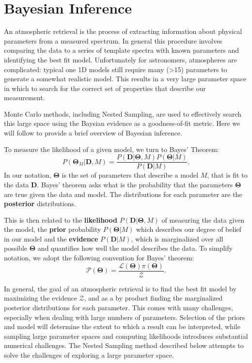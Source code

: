 \section{Bayesian Inference}
An atmospheric retrieval is the process of extracting information about physical parameters from a measured spectrum. 
In general this procedure involves comparing the data to a series of template spectra with known parameters and identifying the best fit model.
Unfortunately for astronomers, atmospheres are complicated: typical one 1D models still require many (>15) parameters to generate a somewhat realistic model. 
This results in a very large parameter space in which to search for the correct set of properties that describe our measurement.

Monte Carlo methods, including Nested Sampling, are used to effectively search this large space using the Baysian evidence as a goodness-of-fit metric.
Here we will follow \parencite{Speagle2019} to provide a brief overview of Bayesian inference.

To measure the likelihood of a given model, we turn to Bayes' Theorem:
\begin{equation}\label{eqn:bayes}
P(\mathbf{\Theta}_{M}|\mathbf{D},M) = \frac{P(\mathbf{D}|\mathbf{\Theta},M)P(\mathbf{\Theta}|M)}{P(\mathbf{D}|M)}.
\end{equation}
In our notation, $\mathbf{\Theta}$ is the set of parameters that describe a model $M$, that is fit to the data $\mathbf{D}$. 
Bayes' theorem asks what is the probability that the parameters $\mathbf{\Theta}$ are true given the data and model. 
The distributions for each parameter are the \textbf{posterior} distributions.

This is then related to the \textbf{likelihood} $P(\mathbf{D}|\mathbf{\Theta},M)$ of measuring the data given the model, the \textbf{prior} probability $P(\mathbf{\Theta}|M)$ which describes our degree of belief in our model and the \textbf{evidence} $P(\mathbf{D}|M)$, which is marginalized over all possible $\mathbf{\Theta}$ and quantifies how well the model describes the data.
To simplify notation, we adopt the following convention for Bayes' theorem:
\begin{equation}
\mathcal{P}(\mathbf{\Theta}) = \frac{\mathcal{L}(\mathbf{\Theta})\pi(\mathbf{\Theta})}{\mathcal{Z}}.
\end{equation}

In general, the goal of an atmospheric retrieval is to find the best fit model by maximizing the evidence $\mathcal{Z}$, and as a by product finding the marginalized posterior distributions for each parameter.
This comes with many challenges, especially when dealing with large numbers of parameters.
Selection of the priors and model will determine the extent to which a result can be interpreted, while sampling large parameter spaces and computing likelihoods introduces substantial numerical challenges. 
The Nested Sampling method described below attempts to solve the challenges of exploring a large parameter space.

